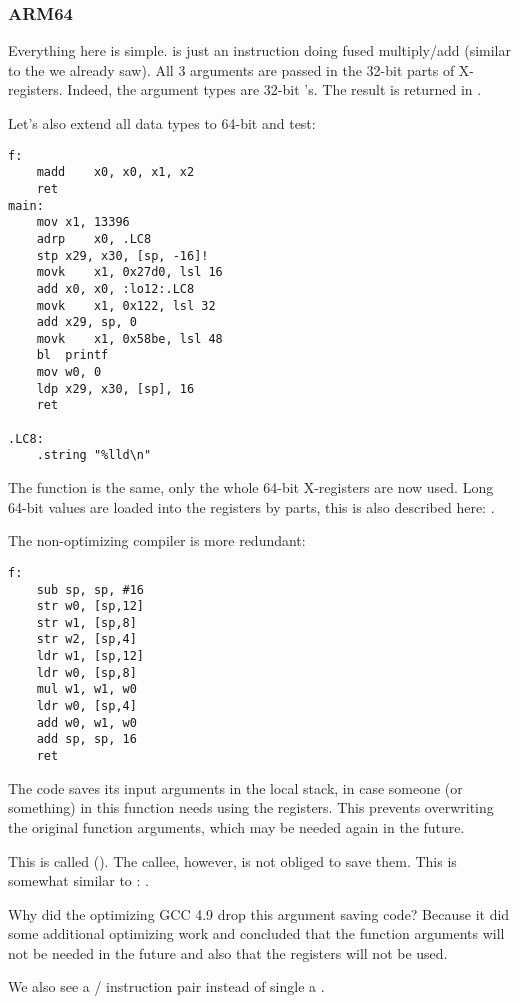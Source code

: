 \subsubsection{ARM64}


Everything here is simple.
 is just an instruction doing fused multiply/add (similar to the  we already saw).
All 3 arguments are passed in the 32-bit parts of X-registers.
Indeed, the argument types are 32-bit 's.
The result is returned in .



Let's also extend all data types to 64-bit  and test:



\begin{lstlisting}
f:
	madd	x0, x0, x1, x2
	ret
main:
	mov	x1, 13396
	adrp	x0, .LC8
	stp	x29, x30, [sp, -16]!
	movk	x1, 0x27d0, lsl 16
	add	x0, x0, :lo12:.LC8
	movk	x1, 0x122, lsl 32
	add	x29, sp, 0
	movk	x1, 0x58be, lsl 48
	bl	printf
	mov	w0, 0
	ldp	x29, x30, [sp], 16
	ret

.LC8:
	.string	"%lld\n"
\end{lstlisting}

The \ttf{} function is the same, only the whole 64-bit X-registers are now used.
Long 64-bit values are loaded into the registers by parts, this is also described here: .


The non-optimizing compiler is more redundant:

\begin{lstlisting}
f:
	sub	sp, sp, #16
	str	w0, [sp,12]
	str	w1, [sp,8]
	str	w2, [sp,4]
	ldr	w1, [sp,12]
	ldr	w0, [sp,8]
	mul	w1, w1, w0
	ldr	w0, [sp,4]
	add	w0, w1, w0
	add	sp, sp, 16
	ret
\end{lstlisting}

The code saves its input arguments in the local stack, 
in case someone (or something) in this function needs using the  
registers. This prevents overwriting the original
function arguments, which may be needed again in the future.

This is called  (\ARMPCS).
The callee, however, is not obliged to save them.
This is somewhat similar to : .

Why did the optimizing GCC 4.9 drop this argument saving code?
Because it did some additional optimizing work and concluded
that the function arguments will not be needed in the future 
and also that the registers  will not be used.


We also see a / instruction pair instead of single a .
